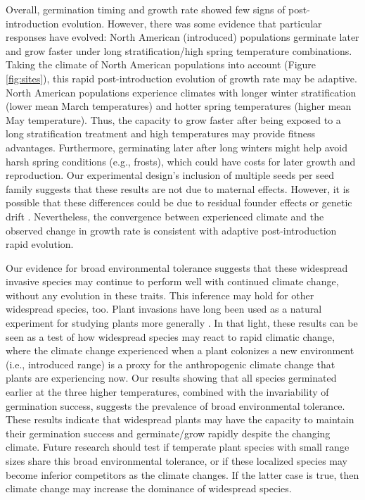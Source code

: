 \documentclass[11pt]{article}\usepackage[]{graphicx}\usepackage[]{color}
\begin{document}
	Overall, germination timing and growth rate showed few signs of post-introduction evolution. However, there was some evidence that particular responses have evolved: North American (introduced) populations germinate later and grow faster under long stratification/high spring temperature combinations. Taking the climate of North American populations into account (Figure \ref{fig:sites}), this rapid post-introduction evolution of growth rate may be adaptive. North American populations experience climates with longer winter stratification  (lower mean March temperatures) and hotter spring temperatures (higher mean May temperature). Thus, the capacity to grow faster after being exposed to a long stratification treatment and high temperatures may provide fitness advantages. Furthermore, germinating later after long winters might help avoid harsh spring conditions  (e.g., frosts), which could have costs for later growth and reproduction. Our experimental design's inclusion of multiple seeds per seed family suggests that these results are not due to maternal effects. However, it is  possible that these differences could be due to residual founder effects \parencite{Shirk2014} or genetic drift \parencite{Eckert1996}. %
	 Nevertheless, the convergence between experienced climate and the observed change in growth rate is consistent with adaptive post-introduction rapid evolution. 
	 
	Our evidence for broad environmental tolerance suggests that these widespread invasive species may continue to perform well with continued climate change, without any evolution in these traits. This inference may hold for other widespread species, too.  Plant invasions have long been used as a natural experiment for studying plants more generally \parencite[e.g., ][]{Yoshida2007}. In that light, these results can be seen as a test of how widespread species may react to rapid climatic change, where the climate change experienced when a plant colonizes a new environment (i.e., introduced range) is a proxy for the anthropogenic climate change that plants are experiencing now.  Our results showing that all species germinated earlier at the three higher temperatures, combined with the invariability of germination success, suggests the prevalence of broad environmental tolerance.  These results indicate that widespread plants may have the capacity to maintain their germination success and germinate/grow rapidly despite the changing climate. Future research should test if temperate plant species with small range sizes share this broad environmental tolerance, or if these localized species may become inferior competitors as the climate changes. If the latter case is true, then climate change may increase the dominance of widespread species. %
	
\end{document}
